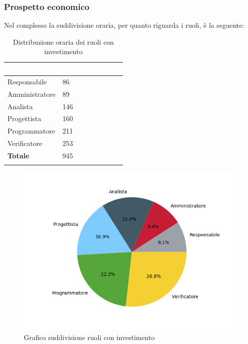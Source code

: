 \subsubsection{Prospetto economico}
Nel complesso la suddivisione oraria, per quanto riguarda i ruoli, è la seguente: 


\begin{longtable}{| C{.30\textwidth}| C{.15\textwidth}| C{.20\textwidth}|}
\hline
{}\textbf{\textcolor{white}{Ruolo}} & \textbf{\textcolor{white}{Ore}} & \textbf{\textcolor{white}{Costo in \euro}} \\
\hline 
Responsabile & 86 & \\
\hline
{}Amministratore & 89 &  \\
\hline
Analista & 146 &  \\
\hline 
{}Progettista & 160 & \\
\hline
Programmatore & 211 &  \\
\hline
{}Verificatore & 253 &  \\
\hline
\textbf{Totale} & 945 &  \\
\hline
\caption{Distribuzione oraria dei ruoli con investimento}
\label{Distribuzione oraria ruoli con investimento}
\end{longtable}

\begin{figure}[H]
	\centering
  		\includegraphics[width=1\linewidth]{./images/torta_toci.png}
  		\caption{Grafico suddivisione ruoli con investimento}
  		\label{fig:grafico suddivione ruoli con investimento}
\end{figure}



